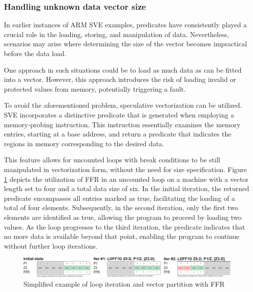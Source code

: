 \subsubsection{Handling unknown data vector size}


In earlier instances of ARM SVE examples, predicates have consistently played a crucial role in the loading, storing, and manipulation of data. Nevertheless, scenarios may arise where determining the size of the vector becomes impractical before the data load. 

One approach in such situations could be to load as much data as can be fitted into a vector. However, this approach introduces the risk of loading invalid or protected values from memory, potentially triggering a fault.

To avoid the aforementioned problem, speculative vectorization can be utilized. SVE incorporates a distinctive predicate that is generated when employing a memory-probing instruction. This instruction essentially examines the memory entries, starting at a base address, and return a predicate that indicates the regions in memory corresponding to the desired data.

This feature allows for uncounted loops with break conditions to be still manipulated in vectorization form, without the need for size specification. Figure \ref{fig:ffr-example} depicts the utilization of FFR in an uncounted loop on a machine with a vector length set to four and a total data size of six. In the initial iteration, the returned predicate encompasses all entries marked as true, facilitating the loading of a total of four elements. Subsequently, in the second iteration, only the first two elements are identified as true, allowing the program to proceed by loading two values. As the loop progresses to the third iteration, the predicate indicates that no more data is available beyond that point, enabling the program to continue without further loop iterations.

\begin{figure}[H]
	\begin{center}
 		\includegraphics[width=\linewidth]{images/ffr-example copy.pdf}
 		\caption{Simplified example of loop iteration and vector partition with FFR}
 		\label{fig:ffr-example}
	\end{center} 
\end{figure}

